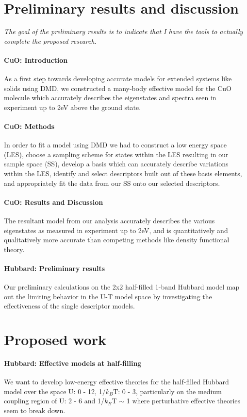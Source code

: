 \documentclass{article}
\begin{document}
\section{Preliminary results and discussion}
\textit{The goal of the preliminary results is to indicate that I have the tools to actually complete the proposed research.}

\paragraph{CuO: Introduction} As a first step towards developing accurate models for extended systems like solids using DMD, we constructed a many-body effective model for the CuO molecule which accurately describes the eigenstates and spectra seen in experiment up to 2eV above the ground state. 

\paragraph{CuO: Methods} In order to fit a model using DMD we had to construct a low energy space (LES), choose a sampling scheme for states within the LES resulting in our sample space (SS), develop a basis which can accurately describe variations within the LES, identify and select descriptors built out of these basis elements, and appropriately fit the data from our SS onto our selected descriptors. 

\paragraph{CuO: Results and Discussion} The resultant model from our analysis accurately describes the various eigenstates as measured in experiment up to 2eV, and is quantitatively and qualitatively more accurate than competing methods like density functional theory.

\paragraph{Hubbard: Preliminary results} Our preliminary calculations on the 2x2 half-filled 1-band Hubbard model map out the limiting behavior in the U-T model space by investigating the effectiveness of the single descriptor models.

\section{Proposed work}
\paragraph{Hubbard: Effective models at half-filling} We want to develop low-energy effective theories for the half-filled Hubbard model over the space U: 0 - 12, 1/$k_B$T: 0 - 3, particularly on the medium coupling region of U: 2 - 6 and 1/$k_B$T $\sim$ 1 where perturbative effective theories seem to break down.
\end{document}
